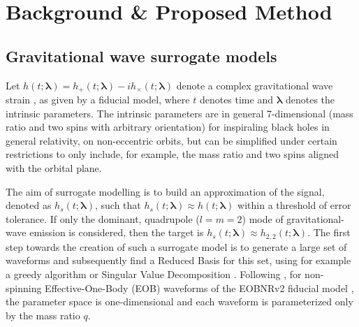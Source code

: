 \documentclass[preprint,12pt]{elsarticle}
\begin{document}
\section{Background \& Proposed Method}
\label{sec:proposed}

\subsection{Gravitational wave surrogate models}
\label{sec:surrogate}

Let $h(t;\boldsymbol{\lambda}) = h_+(t;\boldsymbol{\lambda}) - ih_{\times}(t;\boldsymbol{\lambda})$ denote a complex gravitational wave strain \cite{maggiore}, as given by a fiducial model, where $t$ denotes time and $\boldsymbol{\lambda}$ denotes the intrinsic parameters. The intrinsic parameters are in general 7-dimensional (mass ratio and two spins with arbitrary orientation) for inspiraling black holes in general relativity, on non-eccentric orbits, but can be simplified under certain restrictions to only include, for example, the mass ratio and two spins aligned with the orbital plane.

The aim of surrogate modelling is to build an approximation of the signal, denoted as $h_{s}(t;\boldsymbol{\lambda})$, such that $h_{s}(t;\boldsymbol{\lambda}) \approx h(t;\boldsymbol{\lambda})$ within a threshold of error tolerance. If only the dominant, quadrupole ($l=m=2$) mode \cite{maggiore} of gravitational-wave emission is considered, then the target is $h_{s}(t;\boldsymbol{\lambda}) \approx h_{2,2}(t;\boldsymbol{\lambda})$. 
The first step towards the creation of such a surrogate model is to generate a large set of waveforms and subsequently find a Reduced Basis for this set, using for example a greedy algorithm \cite{field2014fast} or Singular Value Decomposition \cite{blackman2017surrogate}. Following \cite{field2014fast}, for non-spinning Effective-One-Body (EOB) waveforms of the EOBNRv2 fiducial model \cite{pan2011inspiral}, the parameter space is one-dimensional and each waveform is parameterized only by the mass ratio $q$.
\end{document}
